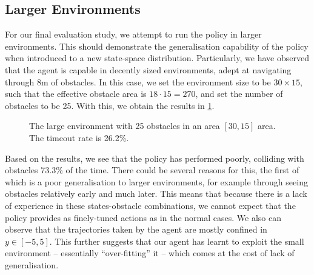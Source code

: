 \subsection{Larger Environments}
For our final evaluation study, we attempt to run the policy in larger environments. This should demonstrate the generalisation capability of the policy when introduced to a new state-space distribution. Particularly, we have observed that the agent is capable in decently sized environments, adept at navigating through 8m of obstacles. In this case, we set the environment size to be $30\times15$, such that the effective obstacle area is $18\cdot15 = 270$, and set the number of obstacles to be 25. 
With this, we obtain the results in \cref{fig:7_large_env_9_policy}.
\begin{figure}[htb]
    \centering
    \captionsetup{justification=centering}
    \caption{The large environment with 25 obstacles in an area $[30, 15]$ area. The timeout rate is 26.2\%.}
    \label{fig:7_large_env_9_policy}
\end{figure}

Based on the results, we see that the policy has performed poorly, colliding with obstacles 73.3\% of the time. There could be several reasons for this, the first of which is a poor generalisation to larger environments, for example through seeing obstacles relatively early and much later. This means that because there is a lack of experience in these states-obstacle combinations, we cannot expect that the policy provides as finely-tuned actions as in the normal cases. We also can observe that the trajectories taken by the agent are mostly confined in $y \in [-5, 5]$. This further suggests that our agent has learnt to exploit the small environment -- essentially ``over-fitting'' it -- which comes at the cost of lack of generalisation.

